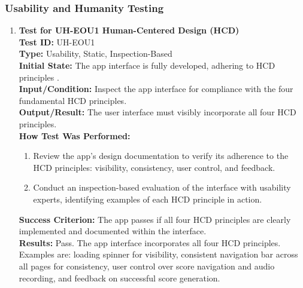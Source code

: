 \documentclass[12pt, titlepage]{article}
\begin{document}
\subsubsection{Usability and Humanity Testing}
\begin{enumerate}
    \item \textbf{Test for UH-EOU1 Human-Centered Design (HCD)} \\
      \newline
      \textbf{Test ID:} UH-EOU1 \\
      \textbf{Type:} Usability, Static, Inspection-Based \\
      \textbf{Initial State:} The app interface is fully developed, adhering to HCD principles \citep*{HCD}. \\
      \textbf{Input/Condition:} Inspect the app interface for compliance with the four fundamental HCD principles. \\
      \textbf{Output/Result:} The user interface must visibly incorporate all four HCD principles. \\
      \textbf{How Test Was Performed:}
      \begin{enumerate}
          \item Review the app’s design documentation to verify its adherence to the HCD principles: visibility, consistency, 
          user control, and feedback.
          \item Conduct an inspection-based evaluation of the interface with usability experts, identifying examples of each HCD 
          principle in action.
      \end{enumerate}
      \textbf{Success Criterion:} The app passes if all four HCD principles are clearly implemented and documented within the interface.\\
      \textbf{Results:} Pass. The app interface incorporates all four HCD principles. Examples are: loading spinner for visibility, consistent navigation bar across all pages for consistency,
      user control over score navigation and audio recording, and feedback on successful score generation.\\


\end{enumerate}
\end{document}
